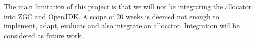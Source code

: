 
The main limitation of this project is that we will not be integrating the allocator into ZGC and OpenJDK. A scope of 20 weeks is deemed not enough to implement, adapt, evaluate and also integrate an allocator. Integration will be considered as future work.


